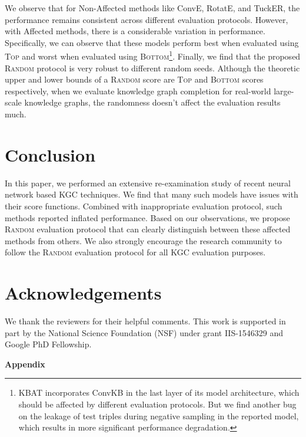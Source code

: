 \documentclass[11pt,a4paper]{article}
\begin{document}
We observe that for Non-Affected methods like ConvE, RotatE, and TuckER, the performance remains consistent across different evaluation protocols. However, with Affected methods, there is a considerable variation in performance. Specifically, we can observe that these models perform best when evaluated using \textsc{Top} and worst when evaluated using \textsc{Bottom}\footnote{KBAT incorporates ConvKB in the last layer of its model architecture, which should be affected by different evaluation protocols. But we find another bug on the leakage of test triples during negative sampling in the reported model, which results in more significant performance degradation.}. Finally, we find that the proposed \textsc{Random} protocol is very robust to different random seeds. Although the theoretic upper and lower bounds of a \textsc{Random} score are \textsc{Top} and \textsc{Bottom} scores respectively, when we evaluate knowledge graph completion for real-world large-scale knowledge graphs, the randomness doesn't affect the evaluation results much. 




 \section{Conclusion}
\label{sec:conclusion}
In this paper, we performed an extensive re-examination study of recent neural network based KGC techniques. We find that many such models have issues with their score functions. Combined with inappropriate evaluation protocol, such methods reported inflated performance. Based on our observations, we propose \textsc{Random} evaluation protocol that can clearly distinguish between these affected methods from others. We also strongly encourage the research community to follow the \textsc{Random} evaluation protocol for all KGC evaluation purposes.

\section*{Acknowledgements}
We thank the reviewers for their helpful comments. This work is supported in part by the National Science Foundation (NSF) under grant IIS-1546329 and Google PhD Fellowship. 



\appendix

\begin{center}
{\bf \large{
    Appendix}}
\end{center}
\end{document}
